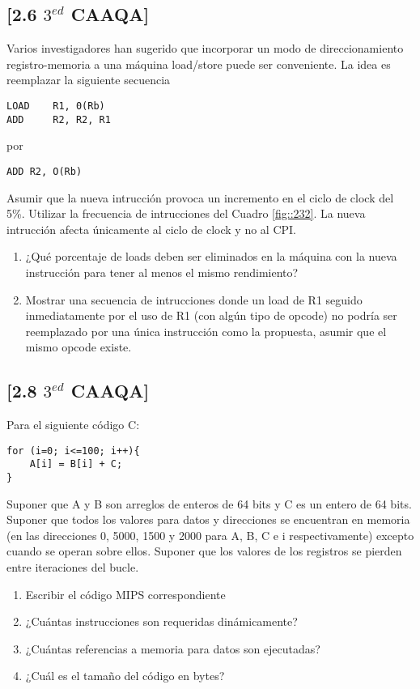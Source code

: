 \subsection{[2.6 $3^{ed}$ CAAQA]}
Varios investigadores han sugerido que incorporar un modo de direccionamiento registro-memoria a una máquina load/store puede ser conveniente. La idea es reemplazar la siguiente secuencia

\begin{verbatim}
LOAD    R1, 0(Rb)
ADD     R2, R2, R1
\end{verbatim}

por

\begin{verbatim}
ADD R2, O(Rb) 
\end{verbatim}



Asumir que la nueva intrucción provoca un incremento en el ciclo de clock del 5\%. Utilizar la frecuencia de intrucciones del Cuadro \ref{fig::232}. La nueva intrucción afecta únicamente al ciclo de clock y no al CPI.

\begin{enumerate}
 \item ¿Qué porcentaje de loads deben ser eliminados en la máquina con la nueva instrucción para tener al menos el mismo rendimiento?
 \item Mostrar una secuencia de intrucciones donde un load de R1 seguido inmediatamente por el uso de R1 (con algún tipo de opcode) no podría ser reemplazado por una única instrucción como la propuesta, asumir que el mismo opcode existe.
\end{enumerate}

\subsection{[2.8 $3^{ed}$ CAAQA]}

Para el siguiente código C:
\begin{verbatim}
for (i=0; i<=100; i++){
	A[i] = B[i] + C;
}
\end{verbatim}


Suponer que A y B son arreglos de enteros de 64 bits y C es un entero de 64 bits. Suponer que todos los valores para datos y direcciones se encuentran en memoria (en las direcciones 0, 5000, 1500 y 2000 para A, B, C e i respectivamente) excepto cuando se operan sobre ellos. Suponer que los valores de los registros se pierden entre iteraciones del bucle.

\begin{enumerate}
 \item Escribir el código MIPS correspondiente
 \item ¿Cuántas instrucciones son requeridas dinámicamente?
 \item ¿Cuántas referencias a memoria para datos son ejecutadas?
 \item ¿Cuál es el tamaño del código en bytes?
\end{enumerate}

